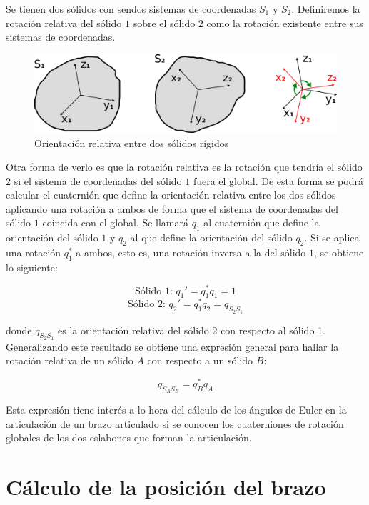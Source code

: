 \documentclass[12pt, a4paper]{report}
\begin{document}
Se tienen dos sólidos con sendos sistemas de coordenadas $S_1$ y $S_2$. Definiremos la rotación relativa del sólido $1$ sobre el sólido $2$ como la rotación existente entre sus sistemas de coordenadas.\\

\begin{center}
\begin{figure}[h]
\includegraphics[scale=1]{../img/relative_orientation.png} 
\caption{Orientación relativa entre dos sólidos rígidos}
\end{figure}
\end{center}

Otra forma de verlo es que la rotación relativa es la rotación que tendría el sólido $2$ si el sistema de coordenadas del sólido $1$ fuera el global. De esta forma se podrá calcular el cuaternión que define la orientación relativa entre los dos sólidos aplicando una rotación a ambos de forma que el sistema de coordenadas del sólido $1$ coincida con el global. Se llamará $q_1$ al cuaternión que define la orientación del sólido $1$ y $q_2$ al que define la orientación del sólido $q_2$. Si se aplica una rotación $q_1^*$ a ambos, esto es, una rotación inversa a la del sólido $1$, se obtiene lo siguiente:

$$ \text{Sólido 1: } q_1' = q_1^*q_1 = 1 $$
$$ \text{Sólido 2: } q_2' = q_1^*q_2 = q_{S_2S_1} $$

donde $q_{S_2S_1}$ es la orientación relativa del sólido 2 con respecto al sólido 1. Generalizando este resultado se obtiene una expresión general para hallar la rotación relativa de un sólido $A$ con respecto a un sólido $B$:

\begin{equation} \label{eq: E18}
q_{S_AS_B} = q_B^*q_A
\end{equation}

Esta expresión tiene interés a lo hora del cálculo de los ángulos de Euler en la articulación de un brazo articulado si se conocen los cuaterniones de rotación globales de los dos eslabones que forman la articulación.

\section{Cálculo de la posición del brazo}
\end{document}
